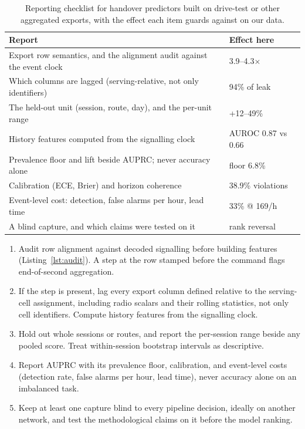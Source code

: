 \documentclass[preprint,review,12pt]{elsarticle}\usepackage{lineno}\linenumbers
\newcommand{\x}{$\times$}
\begin{document}
\begin{table}[t]
\centering
\caption{Reporting checklist for handover predictors built on drive-test or other aggregated exports, with the effect each item guards against on our data.}
\label{tab:checklist}
\footnotesize
\begin{tabularx}{\linewidth}{X l}
\toprule
\textbf{Report} & \textbf{Effect here} \\
\midrule
Export row semantics, and the alignment audit against the event clock & 3.9--4.3\x \\
Which columns are lagged (serving-relative, not only identifiers) & 94\% of leak \\
The held-out unit (session, route, day), and the per-unit range & +12--49\% \\
History features computed from the signalling clock & AUROC 0.87 vs 0.66 \\
Prevalence floor and lift beside AUPRC; never accuracy alone & floor 6.8\% \\
Calibration (ECE, Brier) and horizon coherence & 38.9\% violations \\
Event-level cost: detection, false alarms per hour, lead time & 33\% @ 169/h \\
A blind capture, and which claims were tested on it & rank reversal \\
\bottomrule
\end{tabularx}
\end{table}

\begin{enumerate}
\item Audit row alignment against decoded signalling before building features (Listing~\ref{lst:audit}). A step at the row stamped before the command flags end-of-second aggregation.
\item If the step is present, lag every export column defined relative to the serving-cell assignment, including radio scalars and their rolling statistics, not only cell identifiers. Compute history features from the signalling clock.
\item Hold out whole sessions or routes, and report the per-session range beside any pooled score. Treat within-session bootstrap intervals as descriptive.
\item Report AUPRC with its prevalence floor, calibration, and event-level costs (detection rate, false alarms per hour, lead time), never accuracy alone on an imbalanced task.
\item Keep at least one capture blind to every pipeline decision, ideally on another network, and test the methodological claims on it before the model ranking.
\end{enumerate}
\end{document}
